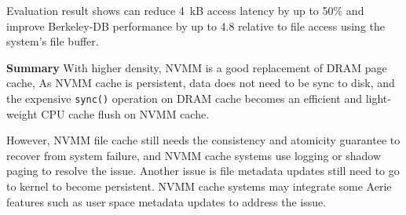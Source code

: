 Evaluation result shows \CChell{} can
reduce 4~kB access latency by up to 50\% and improve Berkeley-DB performance
by up to 4.8\x{} relative to file access using the system's file buffer.

\textbf{Summary} With higher density, NVMM is a good replacement of DRAM page
cache,
As NVMM cache is persistent, data does not need to be sync to disk,
and the expensive \texttt{sync()} operation on DRAM cache becomes 
an efficient and
light-weight CPU cache flush on NVMM cache.

However, NVMM file cache still needs the consistency and atomicity guarantee
to recover from system failure, and NVMM cache systems use logging or 
shadow paging to resolve the issue. Another issue is file metadata updates
still need to go to kernel to become persistent. NVMM cache systems may
integrate some Aerie features such as user space metadata updates to address
 the issue.
